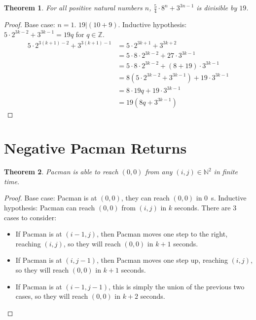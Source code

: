\documentclass{article}
\newtheorem{theorem}{Theorem}
\newcommand{\N}{\mathbb{N}}
\newcommand{\Z}{\mathbb{Z}}
\begin{document}
\subsection{}

\begin{theorem}
    For all positive natural numbers \(n\), \(\frac{5}{4} \cdot 8^n + 3^{3n - 1}\) is divisible by \(19\).
\end{theorem}
\begin{proof}
    Base case: \(n = 1\). \(19 | (10 + 9)\).
    Inductive hypothesis: \(5 \cdot 2^{3k - 2} + 3^{3k - 1} = 19q\) for \(q \in \Z\).
    \begin{align}
        5 \cdot 2^{3 (k + 1) - 2} + 3^{3 (k + 1) - 1} &= 5 \cdot 2^{3k + 1} + 3^{3k + 2} \\
        &= 5 \cdot 8 \cdot 2^{3k - 2} + 27 \cdot 3^{3k - 1} \\
        &= 5 \cdot 8 \cdot 2^{3k - 2} + (8 + 19) \cdot 3^{3k - 1} \\
        &= 8 (5 \cdot 2^{3k - 2} + 3^{3k - 1}) + 19 \cdot 3^{3k - 1} \\
        &= 8 \cdot 19q + 19 \cdot 3^{3k - 1} \\
        &= 19 (8q + 3^{3k - 1})
    \end{align}
\end{proof}

\section{Negative Pacman Returns}

\begin{theorem}
    Pacman is able to reach \((0, 0)\) from any \((i, j) \in \N^2\) in finite time.
\end{theorem}
\begin{proof}
    Base case: Pacman is at \((0, 0)\), they can reach \((0, 0)\) in \SI{0}{\second}.
    Inductive hypothesis: Pacman can reach \((0, 0)\) from \((i, j)\) in \(k\) seconds.
    There are 3 cases to consider:
    \begin{itemize}
        \item If Pacman is at \((i - 1, j)\), then Pacman moves one step to the right, reaching \((i, j)\), so they will reach \((0, 0)\) in \(k + 1\) seconds.
        \item If Pacman is at \((i, j - 1)\), then Pacman moves one step up, reaching \((i, j)\), so they will reach \((0, 0)\) in \(k + 1\) seconds.
        \item If Pacman is at \((i - 1, j - 1)\), this is simply the union of the previous two cases, so they will reach \((0, 0)\) in \(k + 2\) seconds.
    \end{itemize}
\end{proof}
\end{document}
